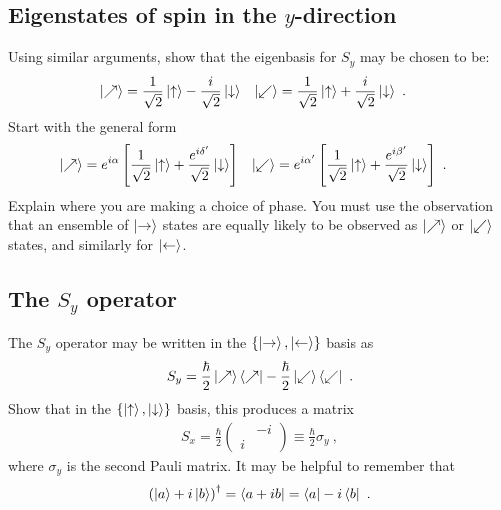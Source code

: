 \subsection{\texorpdfstring{Eigenstates of spin in the $y$-direction}{Eigenstates of spin in the y-direction}}
Using similar arguments, show that the eigenbasis for $S_y$ may be chosen to be:
\begin{align}
    \left|\nearrow\right\rangle &= 
    \frac{1}{\sqrt{2}}\left|\uparrow\right\rangle - \frac{i}{\sqrt{2}}\left|\downarrow\right\rangle
    &
    \left|\swarrow\right\rangle &= 
    \frac{1}{\sqrt{2}}\left|\uparrow\right\rangle + \frac{i}{\sqrt{2}}\left|\downarrow\right\rangle
    \ .
\end{align}
Start with the general form 
\begin{align}
    \left|\nearrow\right\rangle &= 
    e^{i\alpha}\left[\frac{1}{\sqrt{2}}\left|\uparrow\right\rangle + \frac{e^{i\delta'}}{\sqrt{2}}\left|\downarrow\right\rangle \right]
    &
    \left|\swarrow\right\rangle &= 
    e^{i\alpha'}\left[\frac{1}{\sqrt{2}}\left|\uparrow\right\rangle + \frac{e^{i\beta'}}{\sqrt{2}}\left|\downarrow\right\rangle \right]
    \ .
\end{align}
Explain where you are making a choice of phase. You must use the observation that an ensemble of $\left|\rightarrow\right\rangle$ states are equally likely to be observed as $\left|\nearrow\right\rangle$ or $\left|\swarrow\right\rangle$ states, and similarly for $\left|\leftarrow\right\rangle$.

\subsection{\texorpdfstring{The $S_y$ operator}{The Sy operator}}

The $S_y$ operator may be written in the $\{\left|\rightarrow\right\rangle, \left|\leftarrow\right\rangle\}$ basis as
\begin{align}
    S_y = 
    \frac{\hbar}{2}\left|\nearrow\right\rangle\left\langle\nearrow\right|
    -
    \frac{\hbar}{2}\left|\swarrow\right\rangle\left\langle\swarrow\right| \ .
\end{align}
Show that in the $\{\left|\uparrow\right\rangle,\left|\downarrow\right\rangle\}$ basis, this produces a matrix
\begin{align}
    S_x = 
    \frac{\hbar}{2}
    \begin{pmatrix}
         & -i\\ i &  
    \end{pmatrix}
    \equiv \frac{\hbar}{2}  \sigma_y \ ,
\end{align}
where $\sigma_y$ is the second Pauli matrix. It may be helpful to remember that
\begin{align}
    \left(\left|a\right\rangle + i\left|b\right\rangle\right)^\dag = \left\langle a+ib\right| = \left\langle a\right| - i \left\langle b\right| \ .
\end{align}
